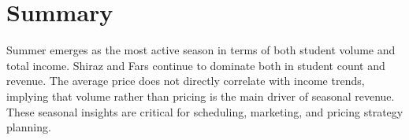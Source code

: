 \documentclass[12pt,a4paper]{article}
\begin{document}
\section*{Summary}
Summer emerges as the most active season in terms of both student volume and total income. Shiraz and Fars continue to dominate both in student count and revenue. The average price does not directly correlate with income trends, implying that volume rather than pricing is the main driver of seasonal revenue. These seasonal insights are critical for scheduling, marketing, and pricing strategy planning.
\end{document}
